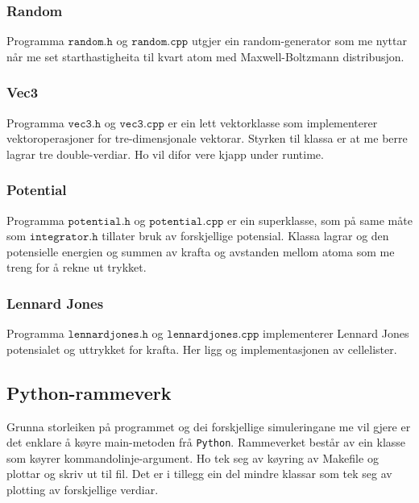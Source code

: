 \documentclass[12pt, a4paper]{article}
\theoremstyle{definition} \newtheorem*{definition}{Teorem}
\begin{document}
        \subsubsection*{Random}
            Programma $\texttt{random.h}$ og $\texttt{random.cpp}$ utgjer ein random-generator som me nyttar når me set starthastigheita til kvart atom med 
            Maxwell-Boltzmann distribusjon.

        \subsubsection*{Vec3}
            Programma $\texttt{vec3.h}$ og $\texttt{vec3.cpp}$ er ein lett vektorklasse som implementerer vektoroperasjoner for tre-dimensjonale vektorar. Styrken til klassa 
            er at me berre lagrar tre double-verdiar. Ho vil difor vere kjapp under runtime.

        \subsubsection*{Potential}
            Programma $\texttt{potential.h}$ og $\texttt{potential.cpp}$ er ein superklasse, som på same måte som $\texttt{integrator.h}$ tillater bruk av forskjellige
            potensial. Klassa lagrar og den potensielle energien og summen av krafta og avstanden mellom atoma som me treng for å rekne ut trykket.

        \subsubsection*{Lennard Jones}
            Programma $\texttt{lennardjones.h}$ og $\texttt{lennardjones.cpp}$ implementerer Lennard Jones potensialet og uttrykket for krafta. Her ligg og implementasjonen 
            av cellelister.


    \subsection*{Python-rammeverk}
        Grunna storleiken på programmet og dei forskjellige simuleringane me vil gjere er det enklare å køyre main-metoden frå \verb!Python!. Rammeverket består av ein klasse
        som køyrer kommandolinje-argument. Ho tek seg av køyring av Makefile og plottar og skriv ut til fil. Det er i tillegg ein del mindre klassar som tek seg av plotting
        av forskjellige verdiar.
\newpage
\end{document}
